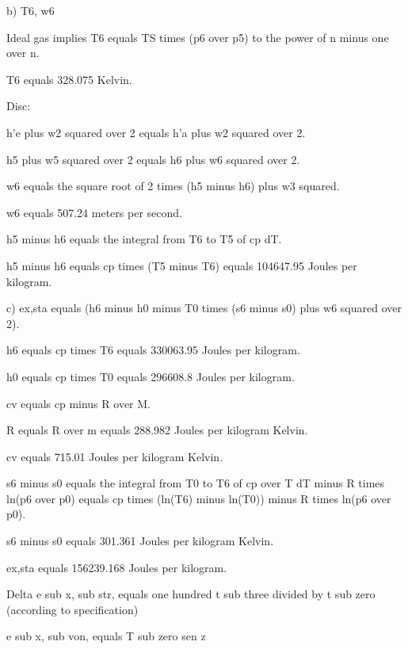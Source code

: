 b) T6, w6

Ideal gas implies T6 equals TS times (p6 over p5) to the power of n minus one over n.

T6 equals 328.075 Kelvin.

Disc:

h'e plus w2 squared over 2 equals h'a plus w2 squared over 2.

h5 plus w5 squared over 2 equals h6 plus w6 squared over 2.

w6 equals the square root of 2 times (h5 minus h6) plus w3 squared.

w6 equals 507.24 meters per second.

h5 minus h6 equals the integral from T6 to T5 of cp dT.

h5 minus h6 equals cp times (T5 minus T6) equals 104647.95 Joules per kilogram.

c) ex,sta equals (h6 minus h0 minus T0 times (s6 minus s0) plus w6 squared over 2).

h6 equals cp times T6 equals 330063.95 Joules per kilogram.

h0 equals cp times T0 equals 296608.8 Joules per kilogram.

cv equals cp minus R over M.

R equals R over m equals 288.982 Joules per kilogram Kelvin.

cv equals 715.01 Joules per kilogram Kelvin.

s6 minus s0 equals the integral from T0 to T6 of cp over T dT minus R times ln(p6 over p0) equals cp times (ln(T6) minus ln(T0)) minus R times ln(p6 over p0).

s6 minus s0 equals 301.361 Joules per kilogram Kelvin.

ex,sta equals 156239.168 Joules per kilogram.

Delta e sub x, sub str, equals one hundred t sub three divided by t sub zero (according to specification)

e sub x, sub von, equals T sub zero sen z